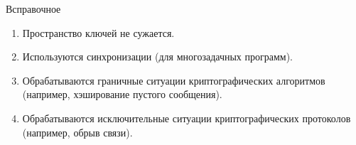 \begin{appendix}{В}{справочное}
\begin{enumerate}
\item 
Пространство ключей не сужается.

\item 
Используются  синхронизации (для многозадачных программ).

\item 
Обрабатываются граничные ситуации криптографических алгоритмов 
(например, хэширование пустого сообщения). 

\item 
Обрабатываются исключительные ситуации криптографических протоколов 
(например, обрыв связи). 
\end{enumerate}

\end{appendix}
